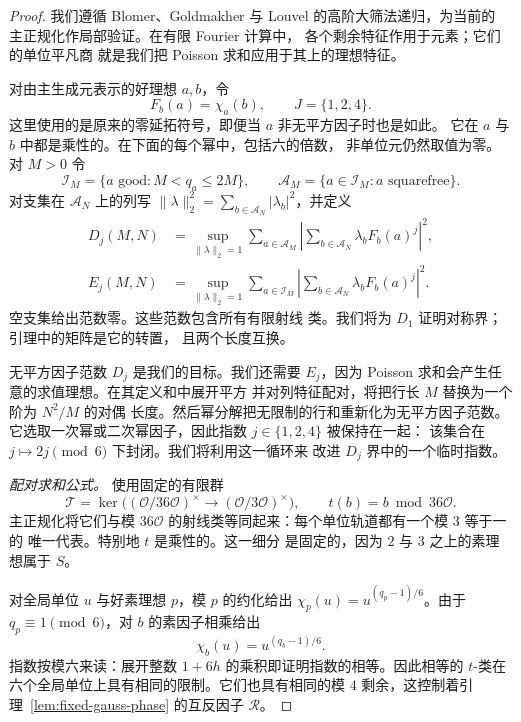 \begin{proof}
我们遵循 Blomer、Goldmakher 与
Louvel \cite[第~3 节]{BGL} 的高阶大筛法递归，为当前的
主正规化作局部验证。在有限 Fourier 计算中，
各个剩余特征作用于元素；它们的单位平凡商
就是我们把 Poisson 求和应用于其上的理想特征。

对由主生成元表示的好理想 $a,b$，令
\[
 F_b(a)=\chi_a(b),\qquad J=\{1,2,4\}.
\]
这里使用的是原来的零延拓符号，即便当 $a$ 非无平方因子时也是如此。
它在 $a$ 与 $b$ 中都是乘性的。在下面的每个幂中，包括六的倍数，
非单位元仍然取值为零。
对 $M>0$ 令
\[
 \mathcal I_M=\{a\text{ good}:M<q_a\le2M\},\qquad
 \mathcal A_M=\{a\in\mathcal I_M:a\text{ squarefree}\}.
\]
对支集在 $\mathcal A_N$ 上的列写
$\|\lambda\|_2^2=\sum_{b\in\mathcal A_N}|\lambda_b|^2$，并定义
\begin{align*}
 D_j(M,N)&=\sup_{\|\lambda\|_2=1}
  \sum_{a\in\mathcal A_M}
  \left|\sum_{b\in\mathcal A_N}\lambda_bF_b(a)^j\right|^2,\\
 E_j(M,N)&=\sup_{\|\lambda\|_2=1}
  \sum_{a\in\mathcal I_M}
  \left|\sum_{b\in\mathcal A_N}\lambda_bF_b(a)^j\right|^2.
\end{align*}
空支集给出范数零。这些范数包含所有有限射线
类。我们将为 $D_1$ 证明对称界；引理中的矩阵是它的转置，
且两个长度互换。

无平方因子范数 $D_j$ 是我们的目标。我们还需要 $E_j$，因为
Poisson 求和会产生任意的求值理想。在其定义和中展开平方
并对列特征配对，将把行长 $M$ 替换为一个阶为 $N^2/M$ 的对偶
长度。然后幂分解把无限制的行和重新化为无平方因子范数。
它选取一次幂或二次幂因子，因此指数 $j\in\{1,2,4\}$ 被保持在一起：
该集合在 $j\mapsto2j\pmod6$ 下封闭。我们将利用这一循环来
改进 $D_j$ 界中的一个临时指数。

\medskip\noindent\emph{配对求和公式。}
使用固定的有限群
\[
 \mathcal T=\ker\bigl((\mathcal O/36\mathcal O)^\times
              \longrightarrow(\mathcal O/3\mathcal O)^\times\bigr),
 \qquad t(b)=b\bmod36\mathcal O.
\]
主正规化将它们与模
$36\mathcal O$ 的射线类等同起来：每个单位轨道都有一个模 $3$ 等于一的
唯一代表。特别地 $t$ 是乘性的。这一细分
是固定的，因为 $2$ 与 $3$ 之上的素理想属于 $S$。

对全局单位 $u$ 与好素理想 $p$，模 $p$ 的约化给出
$\chi_p(u)=u^{(q_p-1)/6}$。由于 $q_p\equiv1\pmod6$，对
$b$ 的素因子相乘给出
\begin{equation}\label{eq:sextic-sieve-unit-class}
 \chi_b(u)=u^{(q_b-1)/6}.
\end{equation}
指数按模六来读：展开整数
$1+6h$ 的乘积即证明指数的相等。因此相等的 $t$-类在
六个全局单位上具有相同的限制。它们也具有相同的模
$4$ 剩余，这控制着引理~\ref{lem:fixed-gauss-phase} 的互反因子
$\mathcal R$。


\end{proof}
